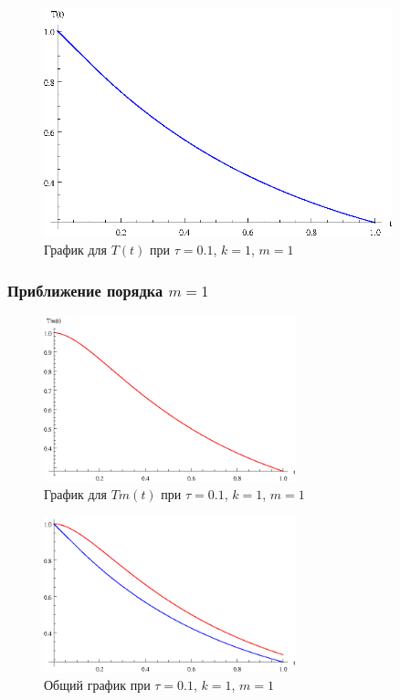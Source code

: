 \vfill

\begin{figure}[h]
\begin{center}
\includegraphics[width=0.9\textwidth]{./3_results/1_1.eps}
\end{center}
\caption{График для $T(t)$ при $\tau=0.1$, $k=1$, $m=1$}
\end{figure}

\vfill

\newpage

\subsubsection{Приближение порядка $m=1$}

\begin{figure}[h]
\begin{center}
\includegraphics[width=0.65\textwidth]{./3_results/1_2.eps}
\end{center}
\caption{График для $Tm(t)$ при $\tau=0.1$, $k=1$, $m=1$}
\end{figure}

\begin{figure}[h]
\begin{center}
\includegraphics[width=0.65\textwidth]{./3_results/1_3.eps}
\end{center}
\caption{Общий график при $\tau=0.1$, $k=1$, $m=1$}
\end{figure}

